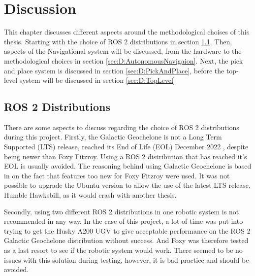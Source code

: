 \chapter{Discussion}\label{sec:Discussion}
This chapter discusses different aspects around the methodological choises of this thesis. Starting with the choice of ROS 2 distributions in section \ref{sec:D:ROS2Distros}. Then, aspects of the Navigational system will be discussed, from the hardware to the methodological choices in section \ref{sec:D:AutonomousNavigaion}. Next, the pick and place system is discussed in section \ref{sec:D:PickAndPlace}, before the top-level system will be discussed in section \ref{sec:D:TopLevel}


\section{ROS 2 Distributions} \label{sec:D:ROS2Distros}
There are some aspects to discuss regarding the choice of ROS 2 distributions during this project. Firstly, the Galactic Geochelone is not a Long Term Supported (LTS) release, reached its End of Life (EOL) December 2022 \cite{ROS2distros}, despite being newer than Foxy Fitzroy. Using a ROS 2 distribution that has reached it's EOL is usually avoided. The reasoning behind using Galactic Geochelone is based in on the fact that features too new for Foxy Fitzroy were used. It was not possible to upgrade the Ubuntu version to allow the use of the latest LTS release, Humble Hawksbill, as it would crash with another thesis.
 
Secondly, using two different ROS 2 distributions in one robotic system is not recommended in any way. In the case of this project, a lot of time was put into trying to get the Husky A200 UGV to give acceptable performance on the ROS 2 Galactic Geochelone distribution without success. And Foxy was therefore tested as a last resort to see if the robotic system would work. There seemed to be no issues with this solution during testing, however, it is bad practice and should be avoided.


